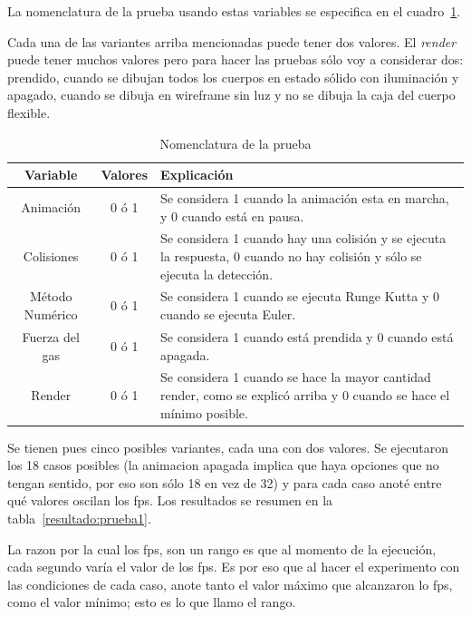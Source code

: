 La nomenclatura de la prueba usando estas variables se especifica en el cuadro~\ref{nomenclatura:prueba}.

Cada una de las variantes arriba mencionadas puede tener dos valores. El \emph{\foreignlanguage{english}{render}} puede tener muchos valores pero para hacer las pruebas sólo voy a considerar dos: prendido, cuando se dibujan todos los cuerpos en estado sólido con iluminación y apagado, cuando se dibuja en wireframe sin luz y no se dibuja la caja del cuerpo flexible.

\begin{table}
\caption[Explicación de la nomenclatura de la prueba del programa]{Nomenclatura de la prueba}
\label{nomenclatura:prueba}
\begin{center}
\begin{tabular} {|c|c|p{10cm}|} \hline
 Variable & Valores & Explicación\\ \hline
 Animación & 0 ó 1 & Se considera 1 cuando la animación esta en marcha, y 0 cuando está en pausa. \\
 Colisiones & 0 ó 1 & Se considera 1 cuando hay una colisión y se ejecuta la respuesta, 0 cuando no hay colisión y sólo se ejecuta la detección. \\
 Método Numérico & 0 ó 1 & Se considera 1 cuando se ejecuta Runge Kutta y 0 cuando se ejecuta Euler. \\
 Fuerza del gas & 0 ó 1 & Se considera 1 cuando está prendida y 0 cuando está apagada. \\
 Render & 0 ó 1 & Se considera 1 cuando se hace la mayor cantidad render, como se explicó arriba y 0 cuando se hace el mínimo posible. \\
\hline
\end{tabular}
\end{center}
\end{table}

Se tienen pues cinco posibles variantes, cada una con dos valores. Se ejecutaron los 18 casos posibles (la animacion apagada implica que haya opciones que no tengan sentido, por eso son sólo 18 en vez de 32) y para cada caso anoté entre qué valores oscilan los fps. Los resultados se resumen en la tabla~\ref{resultado:prueba1}.

La razon por la cual los fps, son un rango es que al momento de la ejecución, cada segundo varía el valor de los fps. Es por eso que al hacer el experimento con las condiciones de cada caso, anote tanto el valor máximo que alcanzaron lo fps, como el valor mínimo; esto es lo que llamo el rango.

